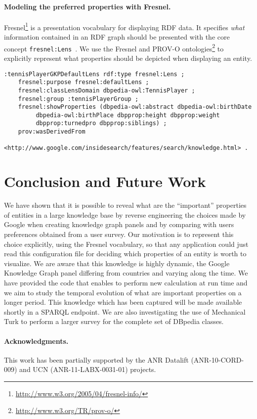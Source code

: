\documentclass[runningheads,a4paper]{llncs}
\begin{document}
\paragraph{\textbf{Modeling the preferred properties with Fresnel.}}
\label{sec:fresnel}
Fresnel\footnote{\url{http://www.w3.org/2005/04/fresnel-info/}} is a presentation vocabulary for displaying RDF data. It specifies \textit{what} information contained in an RDF graph should be presented with the core concept \texttt{fresnel:Lens}~\cite{pietriga2006}. We use the Fresnel and PROV-O ontologies\footnote{\url{http://www.w3.org/TR/prov-o/}} to explicitly represent what properties should be depicted when displaying an entity.
\scriptsize
\begin{verbatim}
:tennisPlayerGKPDefaultLens rdf:type fresnel:Lens ;
	fresnel:purpose fresnel:defaultLens ;
	fresnel:classLensDomain dbpedia-owl:TennisPlayer ;
	fresnel:group :tennisPlayerGroup ;
	fresnel:showProperties (dbpedia-owl:abstract dbpedia-owl:birthDate
		 dbpedia-owl:birthPlace dbpprop:height dbpprop:weight
		 dbpprop:turnedpro dbpprop:siblings) ;
	prov:wasDerivedFrom
	  <http://www.google.com/insidesearch/features/search/knowledge.html> .		
\end{verbatim}	
\normalsize


\section{Conclusion and Future Work}
\label{sec:conclusion}
We have shown that it is possible to reveal what are the ``important'' properties of entities in a large knowledge base by reverse engineering the choices made by Google when creating knowledge graph panels and by comparing with users preferences obtained from a user survey. Our motivation is to represent this choice explicitly, using the Fresnel vocabulary, so that any application could just read this configuration file for deciding which properties of an entity is worth to visualize. We are aware that this knowledge is highly dynamic, the Google Knowledge Graph panel differing from countries and varying along the time. We have provided the code that enables to perform new calculation at run time and we aim to study the temporal evolution of what are important properties on a longer period. This knowledge which has been captured will be made available shortly in a SPARQL endpoint. We are also investigating the use of Mechanical Turk to perform a larger survey for the complete set of DBpedia classes.


\paragraph{\textbf{Acknowledgments.}} %
This work has been partially supported by the ANR Datalift (ANR-10-CORD-009) and UCN (ANR-11-LABX-0031-01) projects.


\nocite{*}

\end{document}
